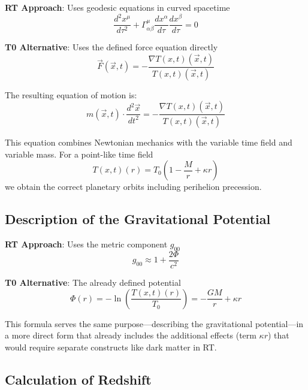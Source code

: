 \documentclass[12pt,a4paper]{article}
\newcommand{\Tfieldt}{T(x,t)}
\newcommand{\Tzero}{T_0}
\newcommand{\vecx}{\vec{x}}
\begin{document}
	\textbf{RT Approach}: Uses geodesic equations in curved spacetime
	\begin{equation}
		\frac{d^2x^{\mu}}{d\tau^2} + \Gamma^{\mu}_{\alpha\beta} \frac{dx^{\alpha}}{d\tau} \frac{dx^{\beta}}{d\tau} = 0
	\end{equation}
	
	\textbf{T0 Alternative}: Uses the defined force equation directly
	\begin{equation}
		\vec{F}(\vecx,t) = -\frac{\nabla\Tfieldt(\vecx,t)}{\Tfieldt(\vecx,t)}
	\end{equation}
	
	The resulting equation of motion is:
	\begin{equation}
		m(\vecx,t) \cdot \frac{d^2\vecx}{dt^2} = -\frac{\nabla\Tfieldt(\vecx,t)}{\Tfieldt(\vecx,t)}
	\end{equation}
	
	This equation combines Newtonian mechanics with the variable time field and variable mass. For a point-like time field
	\begin{equation}
		\Tfieldt(r) = \Tzero\left(1 - \frac{M}{r} + \kappa r\right)
	\end{equation}
	we obtain the correct planetary orbits including perihelion precession.
	
	\subsection{Description of the Gravitational Potential}
	\label{subsec:gravitational_potential}
	
	\textbf{RT Approach}: Uses the metric component $g_{00}$
	\begin{equation}
		g_{00} \approx 1 + \frac{2\Phi}{c^2}
	\end{equation}
	
	\textbf{T0 Alternative}: The already defined potential
	\begin{equation}
		\Phi(r) = -\ln\left(\frac{\Tfieldt(r)}{\Tzero}\right) = -\frac{GM}{r} + \kappa r
	\end{equation}
	
	This formula serves the same purpose—describing the gravitational potential—in a more direct form that already includes the additional effects (term $\kappa r$) that would require separate constructs like dark matter in RT.
	
	\subsection{Calculation of Redshift}
	\label{subsec:redshift}
	
\end{document}
